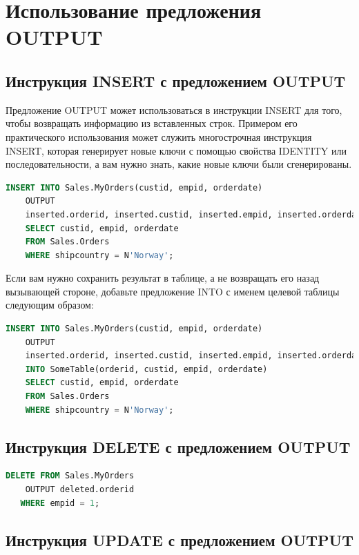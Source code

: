 \section{Использование предложения OUTPUT}

\subsection{Инструкция INSERT с предложением OUTPUT}

Предложение OUTPUT может использоваться в инструкции INSERT для того, чтобы
возвращать информацию из вставленных строк. Примером его практического использования может служить многострочная инструкция INSERT, которая генерирует
новые ключи с помощью свойства IDENTITY или последовательности, а вам нужно
знать, какие новые ключи были сгенерированы. 


\begin{lstlisting}[label=lst:funcReturn, language=sql]
	INSERT INTO Sales.MyOrders(custid, empid, orderdate)
	OUTPUT
	inserted.orderid, inserted.custid, inserted.empid, inserted.orderdate
	SELECT custid, empid, orderdate
	FROM Sales.Orders
	WHERE shipcountry = N'Norway';
\end{lstlisting}

Если вам нужно сохранить результат в таблице, а не возвращать его назад вызывающей стороне, добавьте предложение INTO с именем целевой таблицы следующим образом: 

\begin{lstlisting}[label=lst:funcReturn, language=sql]
	INSERT INTO Sales.MyOrders(custid, empid, orderdate)
	OUTPUT
	inserted.orderid, inserted.custid, inserted.empid, inserted.orderdate
	INTO SomeTable(orderid, custid, empid, orderdate)
	SELECT custid, empid, orderdate
	FROM Sales.Orders
	WHERE shipcountry = N'Norway'; 
\end{lstlisting}

\subsection{Инструкция DELETE с предложением OUTPUT}

\begin{lstlisting}[label=lst:funcReturn, language=sql]
	DELETE FROM Sales.MyOrders
	OUTPUT deleted.orderid
   WHERE empid = 1; 
\end{lstlisting}

\subsection{Инструкция UPDATE с предложением OUTPUT}

